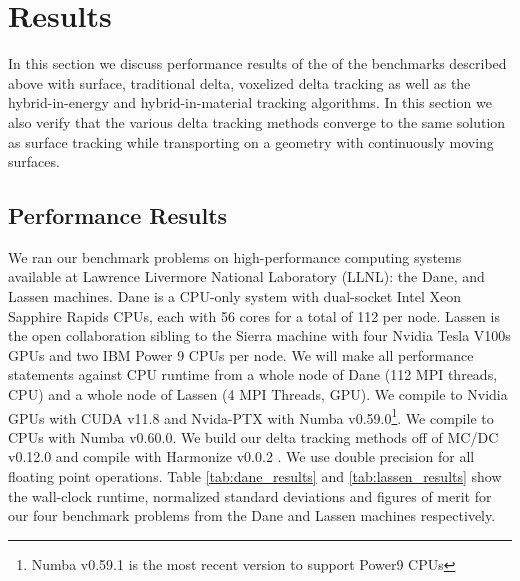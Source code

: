 \section{Results}



In this section we discuss performance results of the of the benchmarks described above with surface, traditional delta, voxelized delta tracking as well as the hybrid-in-energy and hybrid-in-material tracking algorithms.
In this section we also verify that the various delta tracking methods converge to the same solution as surface tracking while transporting on a geometry with continuously moving surfaces.

\subsection{Performance Results}

We ran our benchmark problems on high-performance computing systems available at Lawrence Livermore National Laboratory (LLNL): the Dane, and Lassen machines.
Dane is a CPU-only system with dual-socket Intel Xeon Sapphire Rapids CPUs, each with 56 cores for a total of 112 per node. 
Lassen is the open collaboration sibling to the Sierra machine with four Nvidia Tesla V100s GPUs and two IBM Power 9 CPUs per node.
We will make all performance statements against CPU runtime from a whole node of Dane (112 MPI threads, CPU) and a whole node of Lassen (4 MPI Threads, GPU).
We compile to Nvidia GPUs with CUDA v11.8 and
Nvida-PTX with Numba v0.59.0\footnote{Numba v0.59.1 is the most recent version to support Power9 CPUs}.
We compile to CPUs with Numba v0.60.0.
We build our delta tracking methods off of MC/DC v0.12.0 \cite{transport_cement_mcdc_2024} and compile with Harmonize v0.0.2 \cite{harmonize}.
We use double precision for all floating point operations.
Table \ref{tab:dane_results} and \ref{tab:lassen_results} show the wall-clock runtime, normalized standard deviations and figures of merit for our four benchmark problems from the Dane and Lassen machines respectively.

